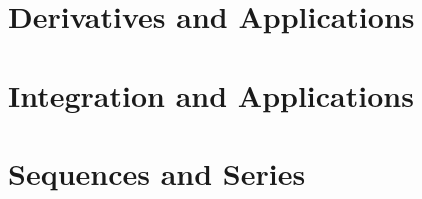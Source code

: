 \documentclass{article}
\theoremstyle{definition}
\theoremstyle{definition}
\begin{document}





\newpage



\part{Derivatives and Applications}





\newpage
\part{Integration and Applications}



\newpage
\part{Sequences and Series}
\end{document}
